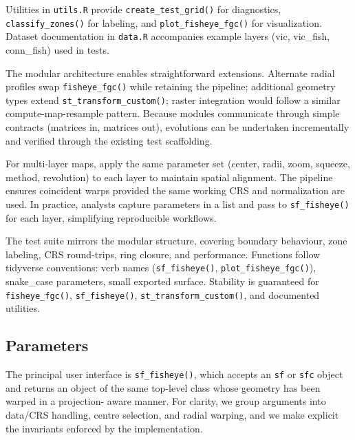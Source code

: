 Utilities in \texttt{utils.R} provide \texttt{create\_test\_grid()} for diagnostics, \texttt{classify\_zones()} for labeling, and \texttt{plot\_fisheye\_fgc()} for visualization. Dataset documentation in \texttt{data.R} accompanies example layers (vic, vic\_fish, conn\_fish) used in tests.

The modular architecture enables straightforward extensions. Alternate radial profiles swap \texttt{fisheye\_fgc()} while retaining the pipeline; additional geometry types extend \texttt{st\_transform\_custom()}; raster integration would follow a similar compute-map-resample pattern. Because modules communicate through simple contracts (matrices in, matrices out), evolutions can be undertaken incrementally and verified through the existing test scaffolding.

For multi-layer maps, apply the same parameter set (center, radii, zoom, squeeze, method, revolution) to each layer to maintain spatial alignment. The pipeline ensures coincident warps provided the same working CRS and normalization are used. In practice, analysts capture parameters in a list and pass to \texttt{sf\_fisheye()} for each layer, simplifying reproducible workflows.

The test suite mirrors the modular structure, covering boundary behaviour, zone labeling, CRS round-trips, ring closure, and performance. Functions follow tidyverse conventions: verb names (\texttt{sf\_fisheye()}, \texttt{plot\_fisheye\_fgc()}), snake\_case parameters, small exported surface. Stability is guaranteed for \texttt{fisheye\_fgc()}, \texttt{sf\_fisheye()}, \texttt{st\_transform\_custom()}, and documented utilities.

\hypertarget{parameters}{%
\subsection{Parameters}\label{parameters}}

The principal user interface is \texttt{sf\_fisheye()}, which accepts an \texttt{sf} or \texttt{sfc} object
and returns an object of the same top-level class whose geometry has been warped in a projection-
aware manner. For clarity, we group arguments into data/CRS handling, centre selection, and radial
warping, and we make explicit the invariants enforced by the implementation.

